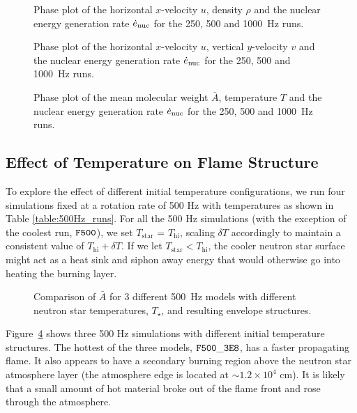 \documentclass[preprint,times,tighten]{aastex63}
\begin{document}
\begin{figure}[t]
    \centering
    \caption{\label{fig:urho}Phase plot of the horizontal $x$-velocity $u$, density $\rho$ and the nuclear energy generation rate $\dot{e}_{\rm nuc}$ for the 250, 500 and 1000~Hz runs.}
\end{figure}

\begin{figure}[t]
    \centering
    \caption{\label{fig:uv}Phase plot of the horizontal $x$-velocity $u$, vertical $y$-velocity $v$ and the nuclear energy generation rate $\dot{e}_{\rm nuc}$ for the 250, 500 and 1000~Hz runs.}
\end{figure}

\begin{figure}[t]
    \centering
    \caption{\label{fig:abar}Phase plot of the mean molecular weight $\bar{A}$, temperature $T$ and the nuclear energy generation rate $\dot{e}_{\rm nuc}$ for the 250, 500 and 1000~Hz runs.}
\end{figure}
    

\subsection{Effect of Temperature on Flame Structure}\label{ssec:temp_structure}

To explore the effect of different initial temperature configurations, we run four simulations fixed at a rotation rate of 500 Hz with temperatures as shown in Table \ref{table:500Hz_runs}. For all the 500 Hz simulations (with the exception of the coolest run, $\tt{F500}$), we set $T_\mathrm{star}$ = $T_\mathrm{hi}$, scaling $\delta T$ accordingly to maintain a consistent value of $T_\mathrm{hi} + \delta T$. If we let $T_\mathrm{star} < T_\mathrm{hi}$, the cooler neutron star surface might act as a heat sink and siphon away energy that would otherwise go into heating the burning layer.

\begin{figure}[t]
\centering
{}
\caption{\label{fig:compare_500Hz_abar} Comparison of $\bar{A}$ for 3 different 500~Hz models with different neutron star temperatures, $T_\star$, and resulting envelope structures. } %
\end{figure}

Figure~\ref{fig:compare_500Hz_abar} shows three 500 Hz simulations with different initial temperature structures. The hottest of the three models, $\tt{F500\_3E8}$, has a faster propagating flame. It also appears to have a secondary burning region above the neutron star atmosphere layer (the atmosphere edge is located at $\sim 1.2\times 10^4$ cm). It is likely that a small amount of hot material broke out of the flame front and rose through the atmosphere.
\end{document}
